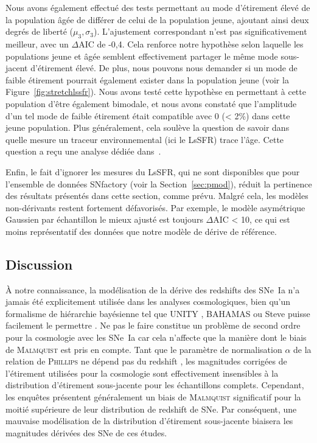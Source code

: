 \documentclass[../main/main.tex]{subfiles}
\begin{document}
Nous avons également effectué des tests permettant au mode d'étirement élevé de
la population âgée de différer de celui de la population jeune, ajoutant ainsi
deux degrés de liberté ($\mu_3, \sigma_3$). L'ajustement correspondant n'est pas
significativement meilleur, avec un $\Delta$AIC de -0,4. Cela renforce notre
hypothèse selon laquelle les populations jeune et âgée semblent effectivement
partager le même mode sous-jacent d'étirement élevé. De plus, nous pouvons nous
demander si un mode de faible étirement pourrait également exister dans la
population jeune (voir la Figure~\ref{fig:stretchlssfr}). Nous avons testé cette
hypothèse en permettant à cette population d'être également bimodale, et nous
avons constaté que l'amplitude d'un tel mode de faible étirement était
compatible avec 0 (< 2\%) dans cette jeune population. Plus généralement, cela
soulève la question de savoir dans quelle mesure un traceur environnemental (ici
le LsSFR) trace l'âge. Cette question a reçu une analyse dédiée
dans~\cite{briday2022}.

Enfin, le fait d'ignorer les mesures du LsSFR, qui ne sont disponibles que pour
l'ensemble de données SNfactory (voir la Section~\ref{sec:pmod}), réduit la
pertinence des résultats présentés dans cette section, comme prévu. Malgré cela,
les modèles non-dérivants restent fortement défavorisés. Par exemple, le modèle
asymétrique Gaussien par échantillon le mieux ajusté est toujours $\Delta$AIC <
10, ce qui est moins représentatif des données que notre modèle de dérive de
référence.


\subsection{Discussion}\label{ssec:disc}

À notre connaissance, la modélisation de la dérive des redshifts des SNe~Ia n'a
jamais été explicitement utilisée dans les analyses cosmologiques, bien qu'un
formalisme de hiérarchie bayésienne tel que UNITY \citep{rubin2015}, BAHAMAS
\citep{shariff2016} ou Steve \citep{hinton2019} puisse facilement le permettre
\citep[voir, par exemple, les sections 1.3 et 2.5 de][]{rubin2015}. Ne pas le
faire constitue un problème de second ordre pour la cosmologie avec les SNe~Ia
car cela n'affecte que la manière dont le biais de \textsc{Malmquist} est pris
en compte. Tant que le paramètre de normalisation $\alpha$ de la relation de
\textsc{Phillips} \citep{phillips1993} ne dépend pas du redshift \citep[une
étude qui dépasse le cadre de cette thèse, mais voir, par
exemple][]{scolnic2018}, les magnitudes corrigées de l'étirement utilisées pour
la cosmologie sont effectivement insensibles à la distribution d'étirement
sous-jacente pour les échantillons complets. Cependant, les enquêtes présentent
généralement un biais de \textsc{Malmquist} significatif pour la moitié
supérieure de leur distribution de redshift de SNe. Par conséquent, une mauvaise
modélisation de la distribution d'étirement sous-jacente biaisera les magnitudes
dérivées des SNe de ces études.
\end{document}
